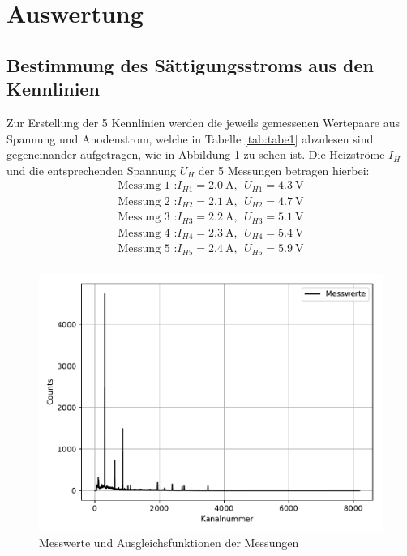 \section{Auswertung}
\subsection{Bestimmung des Sättigungsstroms aus den Kennlinien}
Zur Erstellung der 5 Kennlinien werden die jeweils gemessenen Wertepaare aus
Spannung und Anodenstrom, welche in Tabelle \ref{tab:tabe1} abzulesen sind
gegeneinander aufgetragen, wie in Abbildung \ref{fig:plot1} zu sehen ist.
Die Heizströme $I_{H}$ und die entsprechenden Spannung $U_{H}$  der 5 Messungen betragen hierbei:
\begin{align*}
  \text{Messung 1 :} I_{H1} = \SI{2.0}{\ampere} ,\: \: U_{H1} = \SI{4.3}{\volt} \\
  \text{Messung 2 :} I_{H2} = \SI{2.1}{\ampere} ,\: \: U_{H2} = \SI{4.7}{\volt} \\
  \text{Messung 3 :} I_{H3} = \SI{2.2}{\ampere} ,\: \: U_{H3} = \SI{5.1}{\volt} \\
  \text{Messung 4 :} I_{H4} = \SI{2.3}{\ampere} ,\: \: U_{H4} = \SI{5.4}{\volt} \\
  \text{Messung 5 :} I_{H5} = \SI{2.4}{\ampere} ,\: \: U_{H5} = \SI{5.9}{\volt} \\
\end{align*}



\begin{figure}[H]
  \centering
  \includegraphics{plot1.pdf}
  \caption{Messwerte und Ausgleichsfunktionen der Messungen}
  \label{fig:plot1}
\end{figure}


